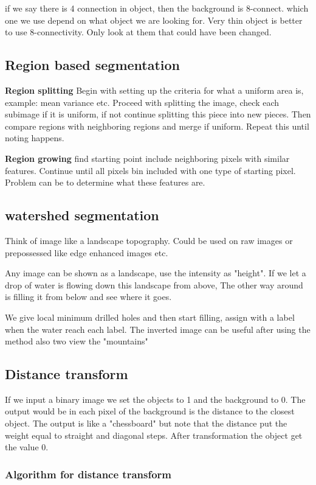 if we say there is 4 connection in object, then the background is 8-connect. 
which one we use depend on what object we are looking for. Very thin object is better to use 8-connectivity. Only look at them that could have been changed. 

\subsection*{Region based segmentation}
\textbf{Region splitting} Begin with setting up the criteria for what a uniform area is, example: mean variance etc. Proceed with splitting the image, check each subimage if it is uniform, if not continue splitting this piece into new pieces. Then compare regions with neighboring regions and merge if uniform. Repeat this until noting happens. 

\textbf{Region growing} find starting point include neighboring pixels with similar features. Continue until all pixels bin included with one type of starting pixel. Problem can be to determine what these features are. 

\subsection*{watershed segmentation}
Think of image like a landscape topography. Could be used on raw images or prepossessed like edge enhanced images etc. 

Any image can be shown as a landscape, use the intensity as "height". If we let a drop of water is flowing down this landscape from above, The other way around is filling it from below and see where it goes. 

We give local minimum drilled holes and then start filling, assign with a label when the water reach each label. The inverted image can be useful after using the method also two view the "mountains" 



\subsection*{Distance transform}
If we input a binary image we set the objects to 1 and the background to 0. The output would be in each pixel of the background is the distance to the closest object. The output is like a "chessboard" but note that the distance put the weight equal to straight and diagonal steps. After transformation the object get the value 0. 

\subsubsection*{Algorithm for distance transform}

